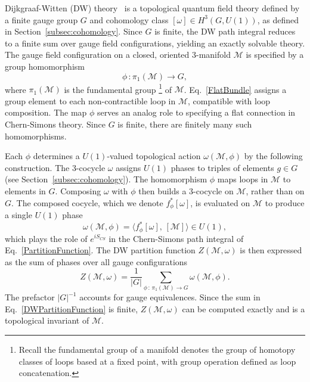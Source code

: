 \documentclass[12pt,a4paper]{article}
\begin{document}
Dijkgraaf-Witten (DW) theory~\cite{Dijkgraaf:1990} is a topological quantum field theory defined by a finite gauge group $G$ and cohomology class $[\omega] \in H^3(G, U(1))$, as defined in Section~\ref{subsec:cohomology}. Since $G$ is finite, the DW path integral reduces to a finite sum over gauge field configurations, yielding an exactly solvable theory. The gauge field configuration on a closed, oriented $3$-manifold $\mathcal{M}$ is specified by a group homomorphism
%
\begin{equation}\label{FlatBundle}
\phi\,\colon \pi_1(\mathcal{M}) \to G,
\end{equation}
%
where $\pi_1(\mathcal{M})$ is the fundamental group%
%
\footnote{Recall the fundamental group of a manifold denotes the group of homotopy classes of loops based at a fixed point, with group operation defined as loop concatenation.} %
%
of $\mathcal{M}$. Eq.\ \eqref{FlatBundle} assigns a group element to each non-contractible loop in $\mathcal{M}$, compatible with loop composition. The map $\phi$ serves an analog role to specifying a flat connection in Chern-Simons theory. Since $G$ is finite, there are finitely many such homomorphisms.

Each $\phi$ determines a $U(1)$-valued topological action $\omega(\mathcal{M}, \phi)$ by the following construction. The 3-cocycle $\omega$ assigns $U(1)$ phases to triples of elements $g \in G$ (see Section~\ref{subsec:cohomology}). The homomorphism $\phi$ maps loops in $\mathcal{M}$ to elements in $G$. Composing $\omega$ with $\phi$ then builds a 3-cocycle on $\mathcal{M}$, rather than on $G$. The composed cocycle, which we denote $f_\phi^*[\omega]$, is evaluated on $\mathcal{M}$ to produce a single $U(1)$ phase
%
\begin{equation}\label{DWAction}
\omega(\mathcal{M}, \phi) = \langle f_\phi^*[\omega],\, [\mathcal{M}] \rangle \in U(1),
\end{equation}
%
which plays the role of $e^{iS_{CS}}$ in the Chern-Simons path integral of Eq.\ \eqref{PartitionFunction}. The DW partition function $Z(\mathcal{M}, \omega)$ is then expressed as the sum of phases over all gauge configurations
%
\begin{equation}\label{DWPartitionFunction}
Z(\mathcal{M}, \omega) = \frac{1}{|G|}\sum_{\phi\,\colon\,\pi_1(\mathcal{M})\to G} \omega(\mathcal{M}, \phi).
\end{equation}
%
The prefactor $|G|^{-1}$ accounts for gauge equivalences. Since the sum in Eq.\ \eqref{DWPartitionFunction} is finite, $Z(\mathcal{M}, \omega)$ can be computed exactly and is a topological invariant of $\mathcal{M}$.
\end{document}
